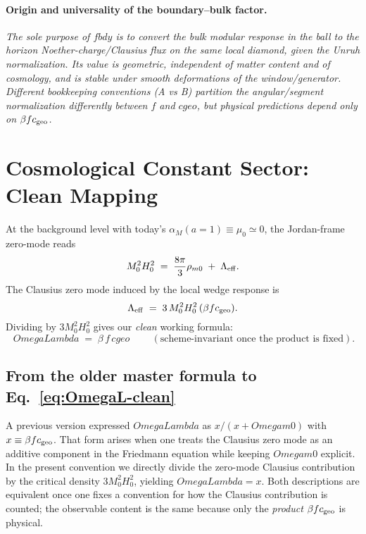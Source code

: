 \documentclass[aps,prd,onecolumn,superscriptaddress,nofootinbib]{revtex4-2}
\def\OmL{OmegaLambda}%
\def\Omm{Omega m0}%
\def\cgeo{cgeo}%
\def\fbdy{fbdy}%
\def\boxed#1{#1}%
\newcommand{\OmL}{\Omega_\Lambda}
\newcommand{\Omm}{\Omega_{m0}}
\newcommand{\cgeo}{c_{\rm geo}}
\newcommand{\fbdy}{f_{\rm bdy}}
\begin{document}
\paragraph*{Origin and universality of the boundary–bulk factor.}
\emph{The sole purpose of \(\fbdy\) is to convert the \emph{bulk} modular response in the ball to the \emph{horizon} Noether-charge/Clausius flux on the same local diamond, given the Unruh normalization. Its value is \emph{geometric}, independent of matter content and of cosmology, and is stable under smooth deformations of the window/generator. Different bookkeeping conventions (A vs B) partition the angular/segment normalization differently between \(f\) and \(\cgeo\), but physical predictions depend only on \(\beta f c_{\rm geo}\).}

\section{Cosmological Constant Sector: Clean Mapping}
\label{sec:OmegaL}
At the background level with today’s \(\alpha_M(a{=}1)\equiv\mu_0\simeq 0\), the Jordan-frame zero-mode reads
\begin{equation}
M_0^2 H_0^2 \;=\; \frac{8\pi}{3}\rho_{m0}\;+\;\Lambda_{\rm eff}.
\end{equation}
The Clausius zero mode induced by the local wedge response is
\begin{equation}
\Lambda_{\rm eff} \;=\; 3\,M_0^2 H_0^2\,(\beta f c_{\rm geo}).
\end{equation}
Dividing by \(3M_0^2H_0^2\) gives our \emph{clean} working formula:
\begin{equation}
\boxed{\ \OmL \;=\; \beta\, f \, \cgeo\ }\qquad
(\text{scheme-invariant once the product is fixed}).
\label{eq:OmegaL-clean}
\end{equation}

\subsection{From the older master formula to Eq.~\eqref{eq:OmegaL-clean}}
\label{sec:Omega-evolution}
A previous version expressed \(\OmL\) as \(x/(x+\Omm)\) with \(x\equiv \beta f c_{\rm geo}\). That form arises when one treats the Clausius zero mode as an additive component in the Friedmann equation while keeping \(\Omm\) explicit. In the present convention we directly divide the zero-mode Clausius contribution by the critical density \(3M_0^2H_0^2\), yielding \(\OmL=x\). Both descriptions are equivalent once one fixes a convention for how the Clausius contribution is counted; the observable content is the same because only the \emph{product} \(\beta f c_{\rm geo}\) is physical.
\end{document}
